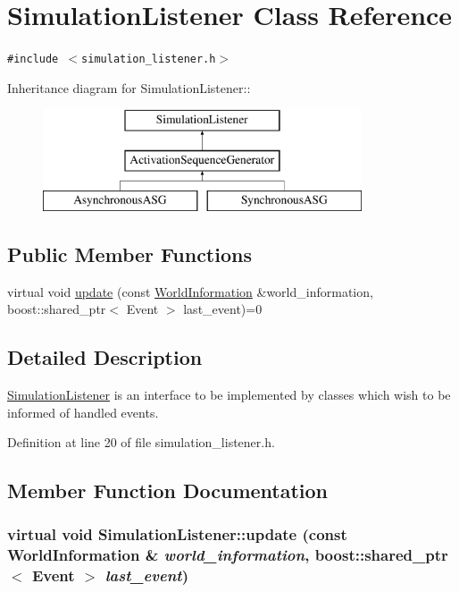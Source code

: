 \hypertarget{class_simulation_listener}{
\section{SimulationListener Class Reference}
\label{class_simulation_listener}
}
{\tt \#include $<$simulation\_\-listener.h$>$}

Inheritance diagram for SimulationListener::\begin{figure}[H]
\begin{center}
\leavevmode
\includegraphics[height=3cm]{class_simulation_listener}
\end{center}
\end{figure}
\subsection*{Public Member Functions}
\begin{CompactItemize}
\item 
virtual void \hyperlink{class_simulation_listener_f1b53fbefce7830648bb059dfd0f18b4}{update} (const \hyperlink{class_world_information}{WorldInformation} \&world\_\-information, boost::shared\_\-ptr$<$ Event $>$ last\_\-event)=0
\end{CompactItemize}


\subsection{Detailed Description}
\hyperlink{class_simulation_listener}{SimulationListener} is an interface to be implemented by classes which wish to be informed of handled events. 

Definition at line 20 of file simulation\_\-listener.h.

\subsection{Member Function Documentation}
\hypertarget{class_simulation_listener_f1b53fbefce7830648bb059dfd0f18b4}{
\subsubsection[update]{\setlength{\rightskip}{0pt plus 5cm}virtual void SimulationListener::update (const {\bf WorldInformation} \& {\em world\_\-information}, \/  boost::shared\_\-ptr$<$ Event $>$ {\em last\_\-event})}}
\label{class_simulation_listener_f1b53fbefce7830648bb059dfd0f18b4}


